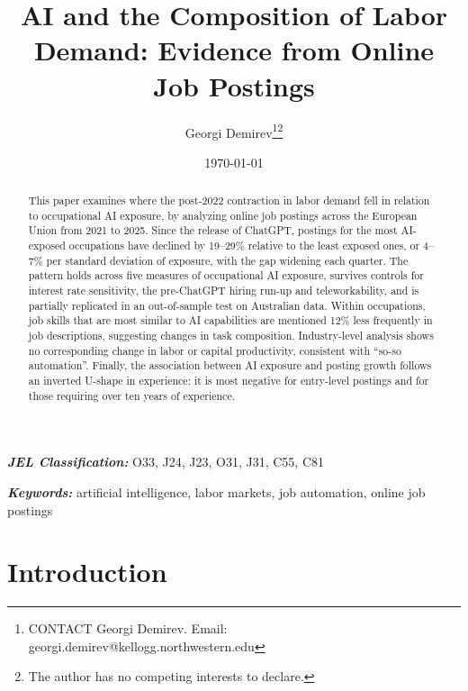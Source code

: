 \documentclass[11pt]{article}
\newcommand{\JEL}[1]{\textbf{\textit{JEL Classification:}} #1}
\newcommand{\Keywords}[1]{\textbf{\textit{Keywords:}} #1}
\begin{document}
\title{AI and the Composition of Labor Demand: Evidence from Online Job Postings}
\author[a]{Georgi Demirev\thanks{CONTACT Georgi Demirev. Email: georgi.demirev@kellogg.northwestern.edu}\thanks{The author has no competing interests to declare.}}
\date{\today}
\maketitle

\begin{abstract}
This paper examines where the post-2022 contraction in labor demand fell in relation to occupational AI exposure, by analyzing online job postings across the European Union from 2021 to 2025. Since the release of ChatGPT, postings for the most AI-exposed occupations have declined by 19--29\% relative to the least exposed ones, or 4--7\% per standard deviation of exposure, with the gap widening each quarter. The pattern holds across five measures of occupational AI exposure, survives controls for interest rate sensitivity, the pre-ChatGPT hiring run-up and teleworkability, and is partially replicated in an out-of-sample test on Australian data. Within occupations, job skills that are most similar to AI capabilities are mentioned 12\% less frequently in job descriptions, suggesting changes in task composition. Industry-level analysis shows no corresponding change in labor or capital productivity, consistent with ``so-so automation''. Finally, the association between AI exposure and posting growth follows an inverted U-shape in experience: it is most negative for entry-level postings and for those requiring over ten years of experience.
\end{abstract}

\JEL{O33, J24, J23, O31, J31, C55, C81}

\Keywords{artificial intelligence, labor markets, job automation, online job postings}



\section{Introduction}
\end{document}
